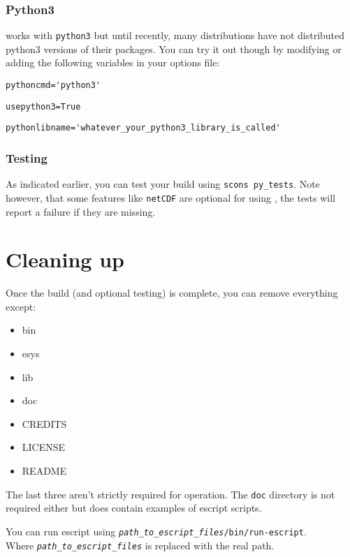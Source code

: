 \subsubsection{Python3}
\escript works with \texttt{python3} but until recently, many distributions have not distributed python3 versions of their packages.
You can try it out though by modifying or adding the following variables in your options file:

\begin{verbatim}
pythoncmd='python3'
\end{verbatim}

\begin{verbatim}
usepython3=True
\end{verbatim}

\begin{verbatim}
pythonlibname='whatever_your_python3_library_is_called'
\end{verbatim}




\subsubsection{Testing}
As indicated earlier, you can test your build using \texttt{scons py_tests}.
Note however, that some features like \texttt{netCDF} are optional for using \escript, the tests will report a failure if
they are missing.

\section{Cleaning up}
\label{sec:cleanup}

Once the build (and optional testing) is complete, you can remove everything except:
\begin{itemize}
 \item bin
 \item esys
 \item lib
 \item doc
 \item CREDITS
 \item LICENSE
 \item README
\end{itemize}
The last three aren't strictly required for operation.
The \texttt{doc} directory is not required either but does contain examples of escript scripts.

You can run escript using \texttt{\textit{path_to_escript_files}/bin/run-escript}.\\
Where \texttt{\textit{path_to_escript_files}} is replaced with the real path.

